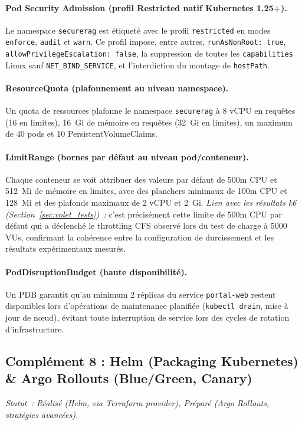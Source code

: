 \paragraph{Pod Security Admission (profil Restricted natif Kubernetes 1.25+).}
Le namespace \texttt{securerag} est étiqueté avec le profil \texttt{restricted} en modes \texttt{enforce}, \texttt{audit} et \texttt{warn}. Ce profil impose, entre autres, \texttt{runAsNonRoot: true}, \texttt{allowPrivilegeEscalation: false}, la suppression de toutes les \texttt{capabilities} Linux sauf \texttt{NET\_BIND\_SERVICE}, et l'interdiction du montage de \texttt{hostPath}.

\paragraph{ResourceQuota (plafonnement au niveau namespace).}
Un quota de ressources plafonne le namespace \texttt{securerag} à 8 vCPU en requêtes (16 en limites), 16~Gi de mémoire en requêtes (32~Gi en limites), un maximum de 40 pods et 10 PersistentVolumeClaims.

\paragraph{LimitRange (bornes par défaut au niveau pod/conteneur).}
Chaque conteneur se voit attribuer des valeurs par défaut de 500m CPU et 512~Mi de mémoire en limites, avec des planchers minimaux de 100m CPU et 128~Mi et des plafonds maximaux de 2 vCPU et 2~Gi. \textit{Lien avec les résultats k6 (Section~\ref{sec:volet_tests})~:} c'est précisément cette limite de 500m CPU par défaut qui a déclenché le throttling CFS observé lors du test de charge à 5000 VUs, confirmant la cohérence entre la configuration de durcissement et les résultats expérimentaux mesurés.

\paragraph{PodDisruptionBudget (haute disponibilité).}
Un PDB garantit qu'au minimum 2 réplicas du service \texttt{portal-web} restent disponibles lors d'opérations de maintenance planifiée (\texttt{kubectl drain}, mise à jour de nœud), évitant toute interruption de service lors des cycles de rotation d'infrastructure.


\subsection{Complément 8 : Helm (Packaging Kubernetes) \& Argo Rollouts (Blue/Green, Canary)}
\label{subsec:comp_helm_rollouts}
\textit{Statut~: Réalisé (Helm, via Terraform provider), Préparé (Argo Rollouts, stratégies avancées).}

